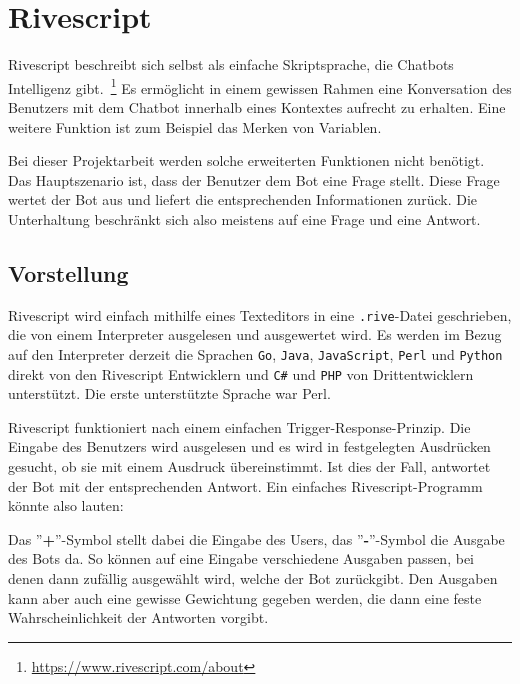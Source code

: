 \chapter{Rivescript} \label{sec:rivescript}
Rivescript beschreibt sich selbst als einfache Skriptsprache, die Chatbots Intelligenz gibt.~\footnote{\url{https://www.rivescript.com/about}} Es ermöglicht in einem gewissen Rahmen eine Konversation des Benutzers mit dem Chatbot innerhalb eines Kontextes aufrecht zu erhalten. Eine weitere Funktion ist zum Beispiel das Merken von Variablen.

Bei dieser Projektarbeit werden solche erweiterten Funktionen nicht benötigt. Das Hauptszenario ist, dass der Benutzer dem Bot eine Frage stellt. Diese Frage wertet der Bot aus und liefert die entsprechenden Informationen zurück. Die Unterhaltung beschränkt sich also meistens auf eine Frage und eine Antwort.

\section{Vorstellung}
Rivescript wird einfach mithilfe eines Texteditors in eine \texttt{.rive}-Datei geschrieben, die von einem Interpreter ausgelesen und ausgewertet wird. Es werden im Bezug auf den Interpreter derzeit die Sprachen \texttt{Go}, \texttt{Java}, \texttt{JavaScript}, \texttt{Perl} und \texttt{Python} direkt von den Rivescript Entwicklern und \texttt{C\#} und \texttt{PHP} von Drittentwicklern unterstützt. Die erste unterstützte Sprache war Perl.

Rivescript funktioniert nach einem einfachen Trigger-Response-Prinzip. Die Eingabe des Benutzers wird ausgelesen und es wird in festgelegten Ausdrücken gesucht, ob sie mit einem Ausdruck übereinstimmt. Ist dies der Fall, antwortet der Bot mit der entsprechenden Antwort.
Ein einfaches Rivescript-Programm könnte also lauten:


Das ''\textbf{+}''-Symbol stellt dabei die Eingabe des Users, das ''\textbf{-}''-Symbol die Ausgabe des Bots da. So können auf eine Eingabe verschiedene Ausgaben passen, bei denen dann zufällig ausgewählt wird, welche der Bot zurückgibt. Den Ausgaben kann aber auch eine gewisse Gewichtung gegeben werden, die dann eine feste Wahrscheinlichkeit der Antworten vorgibt.


